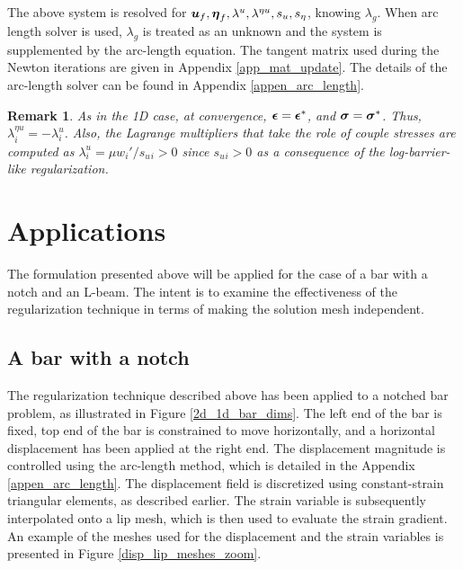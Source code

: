 \documentclass[10pt]{cas-sc}
\newtheorem*{remark}{Remark}
\newcommand{\added}[1]{#1}
\begin{document}
The above system is resolved for $\mbox{\boldmath $u$}_f, \mbox{\boldmath $\eta$}_f, \lambda^u,\lambda^{\eta u},s_u,s_\eta$, knowing $\lambda_g$. When arc length solver is used, $\lambda_g$ is treated as an unknown and the system is supplemented by the arc-length equation. The tangent matrix used during the Newton iterations are given in Appendix \ref{app_mat_update}. The details of the arc-length solver can be found in Appendix \ref{appen_arc_length}.

\begin{remark}
As in the 1D case, at convergence, $\mbox{\boldmath $\epsilon$} = \mbox{\boldmath $\epsilon$}^*$, and $\mbox{\boldmath $\sigma$} = \mbox{\boldmath $\sigma$}^*$. Thus, $\lambda^{\eta u}_i = -\lambda^u_i$. Also, the Lagrange multipliers that take the role of couple stresses are computed as $\lambda^u_i  =  \mu w_i'/ s_u{_i} >0$ since $s_u{_i} >0$ as a consequence of the log-barrier-like regularization.
\end{remark}

\section{Applications}
The formulation presented above will be applied for the case of a bar with a notch and an L-beam. The intent is to examine the effectiveness of the regularization technique in terms of making the solution mesh independent. 


\subsection{A bar with a notch \label{a_bar_with_a_notch}}
The regularization technique described above has been applied to a notched bar problem, as illustrated in Figure \ref{2d_1d_bar_dims}. The left end of the bar is fixed, top end of the bar is constrained to move horizontally, and a horizontal displacement has been applied at the right end. The displacement magnitude is controlled using the arc-length method, which is detailed in the Appendix \ref{appen_arc_length}. The displacement field is discretized using constant-strain triangular elements, as described earlier. The strain variable is subsequently interpolated onto a \added{lip} mesh, which is then used to evaluate the strain gradient. An example of the meshes used for the displacement and the strain variables is presented in Figure \ref{disp_lip_meshes_zoom}.
\end{document}

